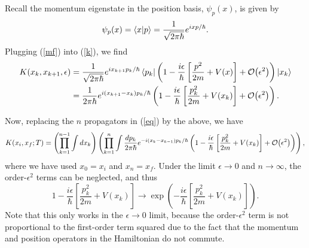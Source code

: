 \documentclass[12pt,a4paper]{article}
\begin{document}
Recall the momentum eigenstate in the position basis, $\psi_p(x)$, is given by
\begin{equation}
    \psi_p(x) = \braket{x}{p} = \frac{1}{\sqrt{2\pi\hbar}}e^{ixp/\hbar}.
    \label{mf}
\end{equation}
Plugging (\ref{mf}) into (\ref{k}), we find
\begin{equation}
    \begin{aligned}
        K(x_{k},x_{k+1},\epsilon) &= \frac{1}{\sqrt{2\pi\hbar}}e^{ix_{k+1}p_k/\hbar}\bra{p_k}\left(1-\frac{i\epsilon}{\hbar}\left[\frac{p^2}{2m} + V(x)\right] + \order{\epsilon^2}\right)\ket{x_{k}}\\
        &=\frac{1}{2\pi\hbar}e^{i(x_{k+1}-x_k)p_k/\hbar}\left(1 -\frac{i\epsilon}{\hbar}\left[\frac{p_k^2}{2m} + V(x_k)\right] + \order{\epsilon^2} \right).
    \end{aligned}
\end{equation}

Now, replacing the $n$ propagators in (\ref{eq}) by the above, we have
\begin{equation}
    K(x_i,x_f;T) = \left(\prod_{k=1}^{n-1}\int dx_k\right)\left(\prod_{k=1}^{n}\int \frac{dp_k}{2\pi\hbar}e^{-i(x_{k}-x_{k-1})p_k/\hbar}\left(1 -\frac{i\epsilon}{\hbar}\left[\frac{p_k^2}{2m} + V(x_k)\right] + \order{\epsilon^2}\right)\right),
\end{equation}
where we have used $x_0 = x_i$ and $x_n=x_f$.
Under the limit $\epsilon \to 0$ and $n \to \infty$, the order-$\epsilon^2$ terms can be neglected, and thus
\begin{equation}
    1 -\frac{i\epsilon}{\hbar}\left[\frac{p_k^2}{2m} + V(x_k)\right] \to \exp\left(-\frac{i\epsilon}{\hbar}\left[\frac{p_k^2}{2m} + V(x_k)\right]\right).
\end{equation}
Note that this only works in the $\epsilon \to 0$ limit, because the order-$\epsilon^2$ term is not proportional to the first-order term squared due to the fact that the momentum and position operators in the Hamiltonian do not commute. 
\end{document}
